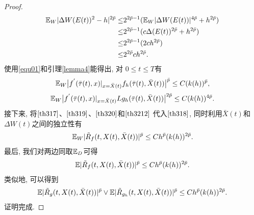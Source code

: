 \begin{proof}
\begin{align}
    \label{th319}
    \mathbb{E}_{W}|\Delta W(E(t))^{2}-h|^{2\bar{p}}
    \leq&
    2^{2\bar{p}-1}(\mathbb{E}_{W}|\Delta W(E(t))|^{4\bar{p}}+h^{2\bar{p}})\nonumber\\
    \leq&
    2^{2\bar{p}-1}(c\Delta (E(t))^{2\bar{p}}+h^{2\bar{p}})\nonumber\\
    \leq&
    2^{2\bar{p}-1}(2ch^{2\bar{p}})\nonumber\\
    \leq&
    2^{2\bar{p}}ch^{2\bar{p}}.
\end{align}
使用\eqref{equ01}和引理\ref{lemma4}能得出, 对 $0\leq t\leq T$有
\begin{align}
    \label{th320}
    \mathbb{E}_{W}\big|f^{'}(\bar{\tau}(t),x)|_{x=\bar{X}(t)}f_{h}(\bar{\tau}(t),\bar{X}(t))\big|^{\bar{p}}\leq C(k(h))^{\bar{p}},
\end{align}
\begin{align}
    \label{th3212}
    \mathbb{E}_{W}\big|f^{'}(\bar{\tau}(t),x)|_{x=\bar{X}(t)}Lg_{h}(\bar{\tau}(t),\bar{X}(t))\big|^{2\bar{p}}\leq C(k(h))^{4\bar{p}}.
\end{align}
接下来, 将$\eqref{th317}$、$\eqref{th319}$、$\eqref{th320}$和$\eqref{th3212}$ 代入$\eqref{th318}$, 同时利用$ \bar{X}(t)$和 $\Delta W(t)$之间的独立性有
\begin{align*}
    \mathbb{E}_{W}|\tilde{R}_{f}(t,X(t),\bar{X}(t))|^{\bar{p}}\leq Ch^{\bar{p}}(k(h))^{2\bar{p}}.
\end{align*}
最后, 我们对两边同取$\mathbb{E}_D$可得
\begin{align*}
    \mathbb{E}|\tilde{R}_{f}(t,X(t),\bar{X}(t))|^{\bar{p}}\leq Ch^{\bar{p}}(k(h))^{2\bar{p}}.
\end{align*}
类似地, 可以得到
\begin{align*}
    \begin{split}
        \mathbb{E}|\tilde{R}_{g}(t,X(t),\bar{X}(t))|^{\bar{p}}\vee\mathbb{E}|\tilde{R}_{g_{h}}(t,X(t),\bar{X}(t))|^{\bar{p}} \leq Ch^{\bar{p}}(k(h))^{2\bar{p}}.
    \end{split}
\end{align*}
证明完成.
 \end{proof}
\clearpage


